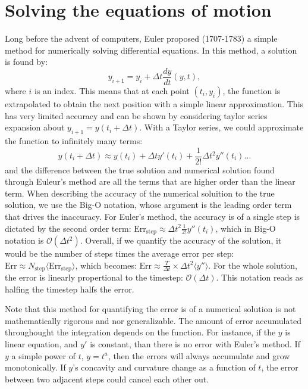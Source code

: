 \section{Solving the equations of motion}

    Long before the advent of computers, Euler proposed (1707-1783) a simple method for numerically solving differential equations. In this method, a solution is found by: 
    \begin{equation}
        y_{i+1} = y_i + \Delta t \frac{dy}{dt}\left(y,t\right),
    \end{equation}
    where $i$ is an index. This means that at each point $(t_i,y_i)$, the function is extrapolated to obtain the next position with a simple linear approximation. This has very limited accuracy and can be shown by considering taylor series expansion about $y_{i+1}=y\left(t_i+\Delta t\right)$. With a Taylor series, we could approximate the function to infinitely many terms:
    \begin{equation}
        y\left(t_i+\Delta t\right) \approx y(t_i) + \Delta t y'(t_i) + \frac{1}{2!}\Delta t^2 y''\left(t_i\right) \dots
    \end{equation}
    and the difference between the true solution and numerical solution found through Euleur's method are all the terms that are higher order than the linear term.  When describing the accuracy of the numerical soluition to the true solution, we use the Big-O notation, whose argument is the leading order term that drives the inaccuracy. For Euler's method, the accuracy is of a single step is dictated by the second order term: $\mathrm{Err}_\mathrm{step} \approx  \Delta t^2 \frac{1}{2!} y''\left(t_i\right)$, which in Big-O notation is $\mathcal{O}\left(\Delta t^2\right)$. Overall, if we quantify the accuracy of the solution, it would be the number of steps times the average error per step: $\mathrm{Err} \approx N_\mathrm{step} \langle \mathrm{Err}_\mathrm{step} \rangle$, which becomes: $\mathrm{Err} \approx \frac{T}{\Delta t} \times \Delta t^2\langle y''\rangle$. For the whole solution, the error is linearly propertional to the timestep: $\mathcal{O}\left(\Delta t\right)$. This notation reads as halfing the timestep halfs the error. 
    
    Note that this method for quantifying the error is of a numerical solution is not mathematically rigorous and nor generalizable. The amount of error accumulated throughought the integration depends on the function. For instance, if the $y$ is linear equation, and $y'$ is constant, than there is no error with Euler's method. If $y$ a simple power of $t$, $y=t^a$, then the errors will always accumulate and grow monotonically. If $y$'s concavity and curvature change as a function of $t$, the error between two adjacent steps could cancel each other out. 
    

